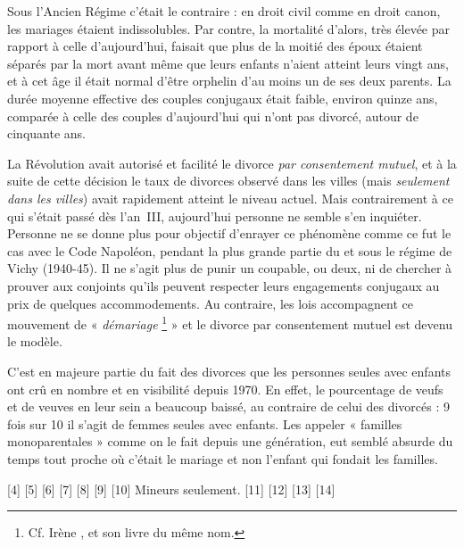  Sous l'Ancien Régime c'était le contraire : en droit civil comme en droit canon, les mariages étaient indissolubles. Par contre, la mortalité d'alors, très élevée par rapport à celle d'aujourd'hui, faisait que plus de la moitié des époux étaient séparés par la mort avant même que leurs enfants n'aient atteint leurs vingt ans, et à cet âge il était normal d'être orphelin d'au moins un de ses deux parents. La durée moyenne effective des couples conjugaux était faible, environ quinze ans, comparée à celle des couples d'aujourd'hui qui n'ont pas divorcé, autour de cinquante ans. 

 La Révolution avait autorisé et facilité le divorce \emph{par consentement mutuel}, et à la suite de cette décision le taux de divorces observé dans les villes (mais \emph{seulement dans les villes}) avait rapidement atteint le niveau actuel. Mais contrairement à ce qui s'était passé dès l'an~III, aujourd'hui personne ne semble s'en inquiéter. Personne ne se donne plus pour objectif d'enrayer ce phénomène comme ce fut le cas avec le Code Napoléon, pendant la plus grande partie du  et sous le régime de Vichy (1940-45). Il ne s'agit plus de punir un coupable, ou deux, ni de chercher à prouver aux conjoints qu'ils peuvent respecter leurs engagements conjugaux au prix de quelques accommodements. Au contraire, les lois accompagnent ce mouvement de « \emph{démariage}%
\footnote{Cf. Irène , et son livre du même nom.}
» et le divorce par consentement mutuel est devenu le modèle. 

 C'est en majeure partie du fait des divorces que les personnes seules avec enfants ont crû en nombre et en visibilité depuis 1970. En effet, le pourcentage de veufs et de veuves en leur sein a beaucoup baissé, au contraire de celui des divorcés : 9 fois sur 10 il s'agit de femmes seules avec enfants. Les appeler « familles monoparentales » comme on le fait depuis une génération, eut semblé absurde du temps tout proche où c'était le mariage et non l'enfant qui fondait les familles. 
 
[4] 
[5] 
[6] 
[7] 
[8] 
[9] 
[10] Mineurs seulement.
[11] 
[12] 
[13] 
[14] 
